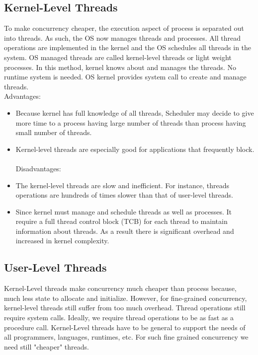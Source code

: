 \documentclass[12pt]{extarticle}
\begin{document}
\subsection{Kernel-Level Threads}

To make concurrency cheaper, the execution aspect of process is separated out into threads. As such, the OS now manages threads and processes. All thread operations are implemented in the kernel and the OS schedules all threads in the system. OS managed threads are called kernel-level threads or light weight processes.
In this method, kernel knows about and manages  the threads. No runtime system is needed. OS kernel provides system call to 
create and manage threads. \\ 

Advantages:

\begin{itemize}
    \item Because kernel has full knowledge of all threads, Scheduler may decide to give more time to a process having large number of threads than process having small number of threads. 
    \item Kernel-level threads are especially good for applications that frequently block. \\ \\
    Disadvantages:
    \item The kernel-level threads are slow and inefficient. For instance, threads operations are hundreds of times slower than that of user-level threads. 
    \item Since kernel must manage and schedule threads as well as processes. It require a full thread control block (TCB) for each thread to maintain information about threads. As a result there is significant overhead and increased in kernel complexity. 
\end{itemize}

\subsection{User-Level Threads}

Kernel-Level threads make concurrency much cheaper than process because, much less state to allocate and initialize. However, for fine-grained concurrency, kernel-level threads still suffer from too much overhead. Thread operations still require system calls. Ideally, we require thread operations to be as fast as a procedure call. Kernel-Level threads have to be general to support the needs of all programmers, languages, runtimes, etc. For such fine grained concurrency we need still "cheaper" threads.
\end{document}
